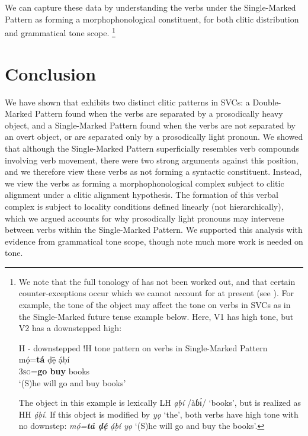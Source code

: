 \documentclass[output=paper]{langsci/langscibook}
\begin{document}
We can capture these data by understanding the verbs under the Single-Marked Pattern as forming a morphophonological constituent, for both clitic distribution and grammatical tone scope.%
\footnote{We 
  note that the full tonology of  has not been worked out, and that certain counter-exceptions occur which we cannot account for at present (see \citealt{Rolle2015}). For example, the tone of the object may affect the tone on verbs in SVCs as in the Single-Marked future tense example below. Here, V1 has high tone, but V2 has a downstepped high:

  \ea
  H - downstepped !H tone pattern on verbs in Single-Marked Pattern\\
  \gll \textup{m\'ọ=\textbf{tá}    {ḍ\=ẹ}   \'ạḅí}\\
  3\textsc{sg}=\textbf{go  buy}   books\\
  \glt ‘(S)he will go and buy books’ 
  \z 


  The object in this example is lexically LH \textit{ạḅí} /àɓ\'ɪ/ ‘books’, but is realized as HH \textit{ạ́ḅí}. If this object is modified by \textit{yọ} ‘the’, both verbs have high tone with no downstep: \textit{m\'ọ=}\textbf{\textit{tá ḍ\'ẹ}} \textit{\'ạḅí yọ} ‘(S)he will go and buy the books’. 
}

\section{Conclusion}

We have shown that  exhibits two distinct clitic patterns in SVCs: a Double-Marked Pattern found when the verbs are separated by a prosodically heavy object, and a Single-Marked Pattern found when the verbs are not separated by an overt object, or are separated only by a prosodically light pronoun. We showed that although the Single-Marked Pattern superficially resembles verb compounds involving verb movement, there were two strong arguments against this position, and we therefore view these verbs as not forming a syntactic constituent. Instead, we view the verbs as forming a morphophonological complex subject to clitic alignment under a clitic alignment hypothesis. The formation of this verbal complex is subject to locality conditions defined linearly (not hierarchically), which we argued accounts for why prosodically light pronouns may intervene between verbs within the Single-Marked Pattern. We supported this analysis with evidence from grammatical tone scope, though note much more work is needed on  tone.
\end{document}
